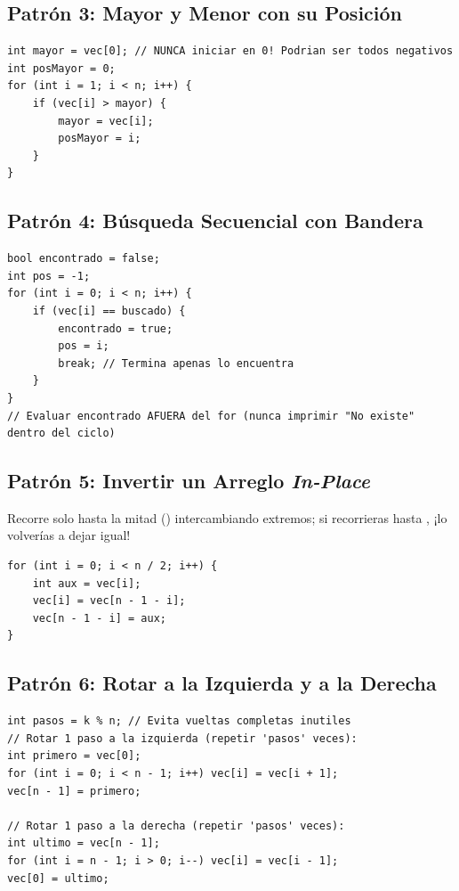 \documentclass[11pt,letterpaper]{article}
\begin{document}
\subsection{Patrón 3: Mayor y Menor con su Posición}
\begin{lstlisting}[style=cppmonitoria]
int mayor = vec[0]; // NUNCA iniciar en 0! Podrian ser todos negativos
int posMayor = 0;
for (int i = 1; i < n; i++) {
    if (vec[i] > mayor) {
        mayor = vec[i];
        posMayor = i;
    }
}
\end{lstlisting}

\subsection{Patrón 4: Búsqueda Secuencial con Bandera}
\begin{lstlisting}[style=cppmonitoria]
bool encontrado = false;
int pos = -1;
for (int i = 0; i < n; i++) {
    if (vec[i] == buscado) {
        encontrado = true;
        pos = i;
        break; // Termina apenas lo encuentra
    }
}
// Evaluar encontrado AFUERA del for (nunca imprimir "No existe" dentro del ciclo)
\end{lstlisting}

\subsection{Patrón 5: Invertir un Arreglo \emph{In-Place}}
Recorre solo hasta la mitad () intercambiando extremos; si recorrieras hasta , ¡lo volverías a dejar igual!
\begin{lstlisting}[style=cppmonitoria]
for (int i = 0; i < n / 2; i++) {
    int aux = vec[i];
    vec[i] = vec[n - 1 - i];
    vec[n - 1 - i] = aux;
}
\end{lstlisting}

\subsection{Patrón 6: Rotar a la Izquierda y a la Derecha}
\begin{lstlisting}[style=cppmonitoria]
int pasos = k % n; // Evita vueltas completas inutiles
// Rotar 1 paso a la izquierda (repetir 'pasos' veces):
int primero = vec[0];
for (int i = 0; i < n - 1; i++) vec[i] = vec[i + 1];
vec[n - 1] = primero;

// Rotar 1 paso a la derecha (repetir 'pasos' veces):
int ultimo = vec[n - 1];
for (int i = n - 1; i > 0; i--) vec[i] = vec[i - 1];
vec[0] = ultimo;
\end{lstlisting}
\end{document}
